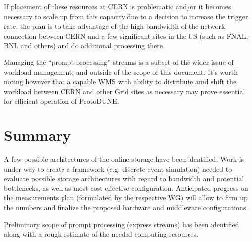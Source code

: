 \documentclass[pdftex,12pt,letter]{article}
\newcommand{\pd}{ProtoDUNE\xspace}
\begin{document}
If placement of these resources at CERN is problematic and/or it becomes necessary to scale up from
this capacity due to a decision to increase the trigger rate,
the plan is to take advantage of the high bandwidth of the network connection between
CERN and a few significant sites in the US (such as FNAL, BNL and others) and do additional processing there.

Managing the ``prompt processing'' streams is a subset of the wider issue of workload management, and outside of
the scope of this document. It's worth noting however that a capable WMS with ability to distribute amd shift the
workload between CERN and other Grid sites as necessary may prove essential for efficient operation of \pd.

\section{Summary}
 A few possible architectures of the online storage have been identified.
Work is under way to create a framework (e.g. discrete-event simulation) needed to evaluate possible storage architectures
with regard to bandwidth and potential bottlenecks, as well as most cost-effective configuration.
Anticipated progress on the measurements plan (formulated by the respective WG) will allow
to firm up the numbers and finalize the proposed hardware and middleware configurations.

Preliminary scope of prompt processing (express streams) has been identified along with a rough estimate of the needed
computing resources.


\end{document}
